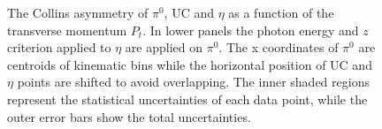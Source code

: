\begin{figure}[H]
  \centering
\caption{The Collins asymmetry of $\pi^0$, UC and $\eta$ as a function of the transverse momentum $P_t$. In lower panels the photon energy and $z$ criterion applied to $\eta$ are applied on $\pi^0$. The x coordinates of $\pi^0$ are centroids of kinematic bins while the horizontal position of UC and $\eta$ points are shifted to avoid overlapping. The inner shaded regions represent the statistical uncertainties of each data point, while the outer error bars show the total uncertainties.}
\label{fig:finalasymmetry1}
\end{figure}

